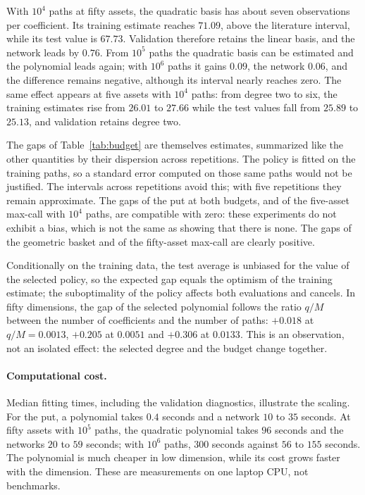 \documentclass[11pt,a4paper]{article}
\begin{document}
With $10^4$ paths at fifty assets, the quadratic basis has about seven observations
per coefficient. Its training estimate reaches $71.09$, above the literature interval,
while its test value is $67.73$. Validation therefore retains the linear basis, and the
network leads by $0.76$. From $10^5$ paths the quadratic basis can be estimated and the
polynomial leads again; with $10^6$ paths it gains $0.09$, the network $0.06$, and the
difference remains negative, although its interval nearly reaches zero. The same effect
appears at five assets with $10^4$ paths: from degree two to six, the training estimates
rise from $26.01$ to $27.66$ while the test values fall from $25.89$ to $25.13$, and
validation retains degree two.

The gaps of Table~\ref{tab:budget} are themselves estimates, summarized like the other
quantities by their dispersion across repetitions. The policy is fitted on the training
paths, so a standard error computed on those same paths would not be justified. The
intervals across repetitions avoid this; with five repetitions they remain approximate.
The gaps of the put at both budgets, and of the five-asset max-call with $10^4$ paths, are
compatible with zero: these experiments do not exhibit a bias, which is not the same as
showing that there is none. The gaps of the geometric basket and of the fifty-asset
max-call are clearly positive.

Conditionally on the training data, the test average is unbiased for the value of the
selected policy, so the expected gap equals the optimism of the training estimate; the
suboptimality of the policy affects both evaluations and cancels. In fifty dimensions,
the gap of the selected polynomial follows the ratio $q/M$ between the number of
coefficients and the number of paths: $+0.018$ at $q/M=0.0013$, $+0.205$ at $0.0051$ and
$+0.306$ at $0.0133$. This is an observation, not an isolated effect: the selected degree
and the budget change together.

\paragraph{Computational cost.}
Median fitting times, including the validation diagnostics, illustrate the scaling.
For the put, a polynomial takes $0.4$ seconds and a network $10$ to $35$ seconds. At fifty
assets with $10^5$ paths, the quadratic polynomial takes $96$ seconds and the networks
$20$ to $59$ seconds; with $10^6$ paths, $300$ seconds against $56$ to $155$ seconds.
The polynomial is much cheaper in low dimension, while its cost grows faster with the
dimension. These are measurements on one laptop CPU, not benchmarks.
\end{document}
